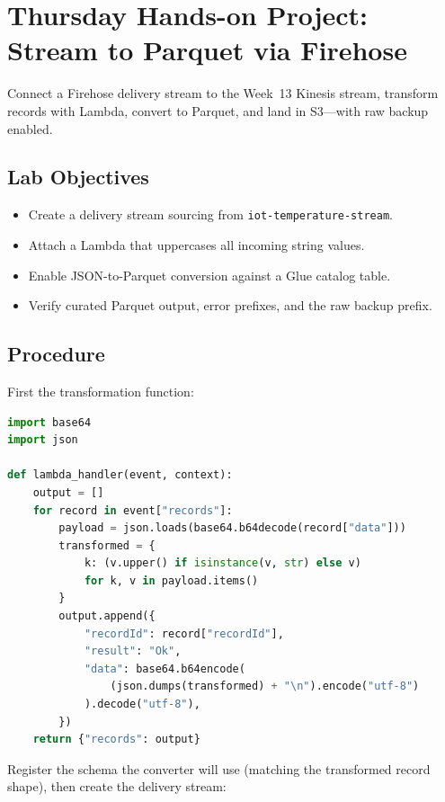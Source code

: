 \section{Thursday Hands-on Project: Stream to Parquet via Firehose}
Connect a Firehose delivery stream to the Week~13 Kinesis stream, transform records with Lambda, convert to Parquet, and land in S3---with raw backup enabled.

\subsection*{Lab Objectives}
\begin{itemize}
    \item Create a delivery stream sourcing from \texttt{iot-temperature-stream}.
    \item Attach a Lambda that uppercases all incoming string values.
    \item Enable JSON-to-Parquet conversion against a Glue catalog table.
    \item Verify curated Parquet output, error prefixes, and the raw backup prefix.
\end{itemize}

\subsection*{Procedure}
First the transformation function:

\begin{lstlisting}[language=Python,caption={Firehose transformation Lambda: uppercase every string field.},label={lst:ch14-lambda}]
import base64
import json

def lambda_handler(event, context):
    output = []
    for record in event["records"]:
        payload = json.loads(base64.b64decode(record["data"]))
        transformed = {
            k: (v.upper() if isinstance(v, str) else v)
            for k, v in payload.items()
        }
        output.append({
            "recordId": record["recordId"],
            "result": "Ok",
            "data": base64.b64encode(
                (json.dumps(transformed) + "\n").encode("utf-8")
            ).decode("utf-8"),
        })
    return {"records": output}
\end{lstlisting}

Register the schema the converter will use (matching the transformed record shape), then create the delivery stream:

